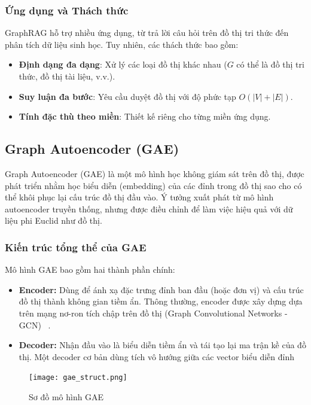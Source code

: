 \documentclass[a4paper]{article}
\begin{document}
\subsubsection{Ứng dụng và Thách thức}
GraphRAG hỗ trợ nhiều ứng dụng, từ trả lời câu hỏi trên đồ thị tri thức đến phân tích dữ liệu sinh học. Tuy nhiên, các thách thức bao gồm:
\begin{itemize}
    \item \textbf{Định dạng đa dạng}: Xử lý các loại đồ thị khác nhau ($G$ có thể là đồ thị tri thức, đồ thị tài liệu, v.v.).
    \item \textbf{Suy luận đa bước}: Yêu cầu duyệt đồ thị với độ phức tạp $O(|V| + |E|)$.
    \item \textbf{Tính đặc thù theo miền}: Thiết kế riêng cho từng miền ứng dụng.
\end{itemize}

\subsection{Graph Autoencoder (GAE)}

Graph Autoencoder (GAE) là một mô hình học không giám sát trên đồ thị, được phát triển nhằm học biểu diễn (embedding) của các đỉnh trong đồ thị sao cho có thể khôi phục lại cấu trúc đồ thị đầu vào. Ý tưởng xuất phát từ mô hình autoencoder truyền thống, nhưng được điều chỉnh để làm việc hiệu quả với dữ liệu phi Euclid như đồ thị.

\subsubsection{Kiến trúc tổng thể của GAE}

Mô hình GAE bao gồm hai thành phần chính:

\begin{itemize}
  \item \textbf{Encoder:} Dùng để ánh xạ đặc trưng đỉnh ban đầu (hoặc đơn vị) và cấu trúc đồ thị thành không gian tiềm ẩn. Thông thường, encoder được xây dựng dựa trên mạng nơ-ron tích chập trên đồ thị (Graph Convolutional Networks - GCN) ~\cite{kipf2016semi}.
  \item \textbf{Decoder:} Nhận đầu vào là biểu diễn tiềm ẩn và tái tạo lại ma trận kề của đồ thị. Một decoder cơ bản dùng tích vô hướng giữa các vector biểu diễn đỉnh
  
\end{itemize}
\begin{figure}[H]
    \centering
    \texttt{[image: gae\_struct.png]}
    \caption{Sơ đồ mô hình GAE }
\end{figure}
\end{document}

